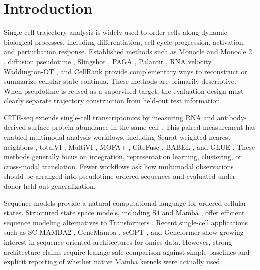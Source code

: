 \documentclass[11pt,twocolumn]{article}
\begin{document}
\vspace{4pt}

\section{Introduction}

Single-cell trajectory analysis is widely used to order cells along dynamic biological processes, including differentiation, cell-cycle progression, activation, and perturbation response. Established methods such as Monocle and Monocle 2 \citep{trapnell2014,Qiu2017Monocle2}, diffusion pseudotime \citep{haghverdi2016}, Slingshot \citep{street2018}, PAGA \citep{wolf2019}, Palantir \citep{setty2019}, RNA velocity \citep{LaManno2018RNAVelocity,bergen2020}, Waddington-OT \citep{Schiebinger2019WaddingtonOT}, and CellRank \citep{lange2022,weiler2024} provide complementary ways to reconstruct or summarize cellular state continua. These methods are primarily descriptive. When pseudotime is reused as a supervised target, the evaluation design must clearly separate trajectory construction from held-out test information.

CITE-seq extends single-cell transcriptomics by measuring RNA and antibody-derived surface protein abundance in the same cell \citep{stoeckius2017}. This paired measurement has enabled multimodal analysis workflows, including Seurat weighted nearest neighbors \citep{hao2021}, totalVI \citep{gayoso2021}, MultiVI \citep{Ashuach2023MultiVI}, MOFA+ \citep{argelaguet2018,Argelaguet2020MOFAplus}, CiteFuse \citep{Chen2020CiteFuse}, BABEL \citep{wu2021}, and GLUE \citep{Cao2022GLUE}. These methods generally focus on integration, representation learning, clustering, or cross-modal translation. Fewer workflows ask how multimodal observations should be arranged into pseudotime-ordered sequences and evaluated under donor-held-out generalization.

Sequence models provide a natural computational language for ordered cellular states. Structured state space models, including S4 \citep{Gu2022S4} and Mamba \citep{gu2023,dao2024}, offer efficient sequence modeling alternatives to Transformers \citep{vaswani2017}. Recent single-cell applications such as SC-MAMBA2 \citep{zhao2024}, GeneMamba \citep{qi2025}, scGPT \citep{cui2024}, and Geneformer \citep{theodoris2023} show growing interest in sequence-oriented architectures for omics data. However, strong architecture claims require leakage-safe comparison against simple baselines and explicit reporting of whether native Mamba kernels were actually used.
\end{document}
